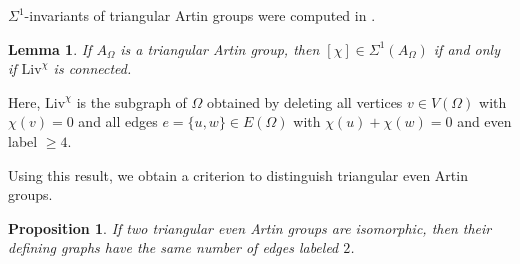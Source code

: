 \documentclass[10pt, oneside]{amsart}
\newtheorem{lemma}[theorem]{Lemma}
\newtheorem{proposition}[theorem]{Proposition}
\theoremstyle{definition}
\theoremstyle{remark}
\theoremstyle{plain}
\begin{document}
$\Sigma^1$-invariants of triangular Artin groups were computed in \cite[Lemma 7.13]{Escartín-MP}.

\begin{lemma}
If $A_\Omega$ is a triangular Artin group, then $[\chi]\in\Sigma^1(A_\Omega)$ if and only if $\mathrm{Liv}^\chi$ is connected.
\end{lemma}

Here, $\mathrm{Liv}^\chi$ is the subgraph of $\Omega$ obtained by deleting all vertices $v\in V(\Omega)$ with $\chi(v)=0$ and all edges $e=\{u,w\}\in E(\Omega)$ with $\chi(u)+\chi(w)=0$ and even label $\geq 4$.

Using this result, we obtain a criterion to distinguish  triangular even Artin groups.

\begin{proposition}\label{TriangleArtin}
If two triangular even Artin groups are isomorphic, then their defining graphs have the same number of edges labeled $2$.
\end{proposition}
\end{document}
